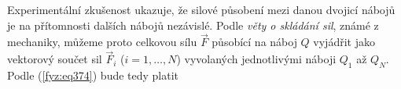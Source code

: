     Experimentální zkušenost ukazuje, že silové působení mezi danou dvojicí nábojů je na přítomnosti
    dalších nábojů nezávislé. Podle \emph{věty o skládání sil}, známé z mechaniky, můžeme proto
    celkovou sílu \(\vec{F}\) působící na náboj \(Q\) vyjádřit jako vektorový součet sil
    \(\vec{F}_i\) (\(i = 1, \ldots,N\)) vyvolaných jednotlivými náboji \(Q_1\) až \(Q_N\). Podle
    (\ref{fyz:eq374}) bude tedy platit
    
